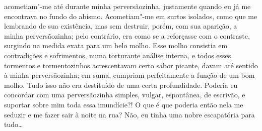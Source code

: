 acometiam"-me até durante minha perversãozinha, justamente quando eu já
me encontrava no fundo do abismo. Acometiam"-me em surtos isolados, como
que me lembrando de sua existência, mas sem destruir, porém, com sua
aparição, a minha perversãozinha; pelo contrário, era como se a
reforçasse com o contraste, surgindo na medida exata para um belo
molho. Esse molho consistia em contradições e sofrimentos, numa
torturante análise interna, e todos esses tormentos e tormentozinhos
acrescentavam certo sabor picante, davam até sentido à minha
perversãozinha; em suma, cumpriam perfeitamente a função de um bom
molho. Tudo isso não era destituído de uma certa profundidade. Poderia
eu concordar com uma perversãozinha simples, vulgar, espontânea, de
escrivão, e suportar sobre mim toda essa imundície?! O que é que
poderia então nela me seduzir e me fazer sair à noite na rua? Não, eu
tinha uma nobre escapatória para tudo\ldots{}

